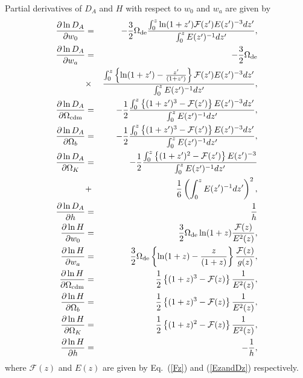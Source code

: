 \documentclass[useAMS,usenatbib]{mn2e}
\begin{document}
Partial derivatives of $D_A$ and $H$ with respect to $w_0$ and 
$w_a$ are given by \citep{Shoji:2008xn}
\begin{eqnarray*}\label{Eq:drv}
{\partial \ln{D_A} \over \partial w_0}
&=&-{3\over2}\Omega_{\rm de}{\int_0^z \ln(1+z^{\prime}) \mathcal{F}(z^{\prime})E(z^{\prime})^{-3}dz^{\prime}
\over\int_0^z E(z^{\prime})^{-1}dz^{\prime}},\\
{\partial \ln{D_A} \over \partial w_a}&=&-{3\over2}\Omega_{\rm de}\nonumber\\
&\times&{\int_0^z  \left\{ \ln(1+z^{\prime})-\frac{z^{\prime}}{(1+z^{\prime})} \right\}\mathcal{F}(z^{\prime})E(z^{\prime})^{-3}dz^{\prime}\over\int_0^z E(z^{\prime})^{-1}dz^{\prime}}, \\
{\partial \ln{D_A} \over \partial  \Omega_{{\rm cdm}}}&=&-{1\over2}{\int_0^z \left\{  (1+ z^\prime)^3 - \mathcal{F}(z^\prime)\right\}  E(z^{\prime})^{-3}dz^{\prime}
\over\int_0^z E(z^{\prime})^{-1}dz^{\prime}},\\
{\partial \ln{D_A} \over \partial \Omega_b}&=&-{1\over2}{\int_0^z\left\{ (1+ z^\prime)^3 - \mathcal{F}(z^\prime)\right\}  E(z^{\prime})^{-3}dz^{\prime} \over\int_0^z E(z^{\prime})^{-1}dz^{\prime}},\\
{\partial \ln{D_A} \over \partial  \Omega_K}&=&-{1 \over2} {\int_0^z\left\{(1+z^{\prime})^2 - \mathcal{F}(z^\prime)\right\}E(z^{\prime})^{-3} \over \int_0^z E(z^{\prime})^{-1}dz^{\prime}}\\\nonumber &+&  \frac{1}{6}  \left(  \int_0^z E(z^{\prime})^{-1}dz^{\prime} \right)^2,\\
{\partial \ln{D_A} \over \partial h}&=& 1 \over h\\
{\partial \ln{H} \over \partial w_0}&=&{3\over2}\Omega_{\rm de} \ln(1+z){\mathcal{F}(z)\over E^2(z)},\\
{\partial \ln{H} \over \partial w_a}&=&{3\over2}\Omega_{\rm de}
\left\{\ln(1+z)-\frac{z}{(1+z)}\right\}{\mathcal{F}(z)\over g(z)},\\
{\partial \ln{H} \over \partial  \Omega_{{\rm cdm}}}&=&{1\over2}\left\{(1+z)^3  - \mathcal{F}(z) \right\}{1\over E^2(z)}, \\
{\partial \ln{H} \over \partial  \Omega_b}&=&{1\over2}\left\{ (1+z)^3  - \mathcal{F}(z) \right\}{1\over E^2(z)}, \\
{\partial \ln{H} \over \partial  \Omega_K}&=& {1\over2}\left\{ (1+z)^2 - \mathcal{F}(z) \right\}{1\over E^2(z)},\\
{\partial \ln{H} \over \partial h}&=& -\frac{1}{h},
\end{eqnarray*}
where $\mathcal{F}(z)$ and $E(z)$ are given by Eq.~(\ref{Fz}) and (\ref{EzandDz}) respectively.
\end{document}
